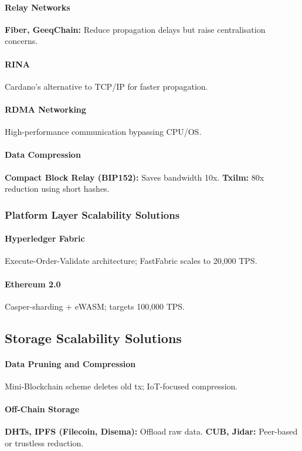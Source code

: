 \paragraph{Relay Networks}
\textbf{Fiber, GeeqChain:} Reduce propagation delays but raise centralisation concerns.

\paragraph{RINA}
Cardano’s alternative to TCP/IP for faster propagation.

\paragraph{RDMA Networking}
High-performance communication bypassing CPU/OS.

\paragraph{Data Compression}
\textbf{Compact Block Relay (BIP152):} Saves bandwidth 10x.  
\textbf{Txilm:} 80x reduction using short hashes.

\subsubsection{Platform Layer Scalability Solutions}
\paragraph{Hyperledger Fabric}
Execute-Order-Validate architecture; FastFabric scales to 20,000 TPS.

\paragraph{Ethereum 2.0}
Casper-sharding + eWASM; targets 100,000 TPS.

\subsection{Storage Scalability Solutions}
\paragraph{Data Pruning and Compression}
Mini-Blockchain scheme deletes old tx; IoT-focused compression.

\paragraph{Off-Chain Storage}
\textbf{DHTs, IPFS (Filecoin, Disema):} Offload raw data.  
\textbf{CUB, Jidar:} Peer-based or trustless reduction.

